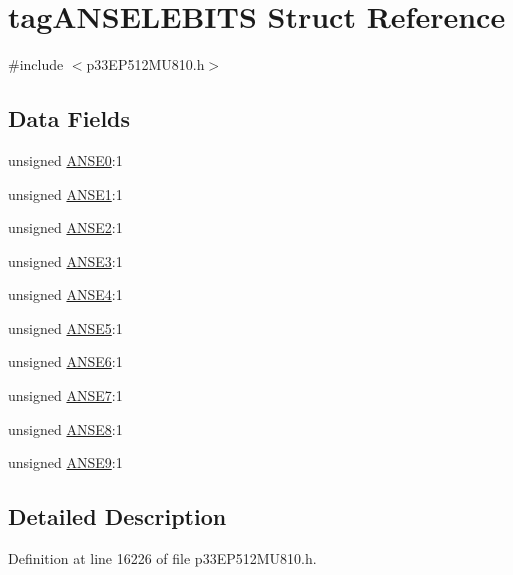 \hypertarget{structtag_a_n_s_e_l_e_b_i_t_s}{}\section{tag\+A\+N\+S\+E\+L\+E\+B\+I\+TS Struct Reference}
\label{structtag_a_n_s_e_l_e_b_i_t_s}


{\ttfamily \#include $<$p33\+E\+P512\+M\+U810.\+h$>$}

\subsection*{Data Fields}
\begin{DoxyCompactItemize}
\item 
unsigned \hyperlink{structtag_a_n_s_e_l_e_b_i_t_s_ae67f4af3164ee84825776f01dd4d3b65}{A\+N\+S\+E0}\+:1
\item 
unsigned \hyperlink{structtag_a_n_s_e_l_e_b_i_t_s_acdbed37ec94c2468058c8e2c60093117}{A\+N\+S\+E1}\+:1
\item 
unsigned \hyperlink{structtag_a_n_s_e_l_e_b_i_t_s_a0daafc9fa21ccf5f277f34ce64ead1cc}{A\+N\+S\+E2}\+:1
\item 
unsigned \hyperlink{structtag_a_n_s_e_l_e_b_i_t_s_ab275fa79f7780cf3ea2ec0ae3053e723}{A\+N\+S\+E3}\+:1
\item 
unsigned \hyperlink{structtag_a_n_s_e_l_e_b_i_t_s_a3aeb275396c0480684dba12bba3c29ed}{A\+N\+S\+E4}\+:1
\item 
unsigned \hyperlink{structtag_a_n_s_e_l_e_b_i_t_s_a1b178dd44ca11b38262569f907837eae}{A\+N\+S\+E5}\+:1
\item 
unsigned \hyperlink{structtag_a_n_s_e_l_e_b_i_t_s_aaaf2afe530524dba8fc3c9fbdf95d752}{A\+N\+S\+E6}\+:1
\item 
unsigned \hyperlink{structtag_a_n_s_e_l_e_b_i_t_s_a70285d3255a7f95d499dfc521fe8a012}{A\+N\+S\+E7}\+:1
\item 
unsigned \hyperlink{structtag_a_n_s_e_l_e_b_i_t_s_acc9fe213f7b1fc14324de3cab03c235b}{A\+N\+S\+E8}\+:1
\item 
unsigned \hyperlink{structtag_a_n_s_e_l_e_b_i_t_s_af7cef197534c139cd4dc549a08cdac2e}{A\+N\+S\+E9}\+:1
\end{DoxyCompactItemize}


\subsection{Detailed Description}


Definition at line 16226 of file p33\+E\+P512\+M\+U810.\+h.



